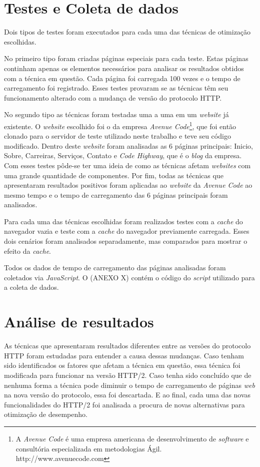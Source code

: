 \section{Testes e Coleta de dados}

Dois tipos de testes foram executados para cada uma das técnicas de otimização escolhidas.

No primeiro tipo foram criadas páginas especiais para cada teste. Estas páginas continham apenas os elementos necessários para analisar os resultados obtidos com a técnica em questão. Cada página foi carregada 100 vezes e o tempo de carregamento foi registrado. Esses testes provaram se as técnicas têm seu funcionamento alterado com a mudança de versão do protocolo HTTP.

No segundo tipo as técnicas foram testadas uma a uma em um \textit{website} já existente. O \textit{website} escolhido foi o da empresa \textit{Avenue Code}\footnote{A \textit{Avenue Code} é uma empresa americana de desenvolvimento de \textit{software} e consultória especializada em metodologias Ágil. http://www.avenuecode.com}, que foi então clonado para o servidor de teste utilizado neste trabalho e teve seu código modificado. Dentro deste \textit{website} foram analisadas as 6 páginas principais: Inicio, Sobre, Carreiras, Serviços, Contato e \textit{Code Highway}, que é o \textit{blog} da empresa. Com esses testes pôde-se ter uma ideia de como as técnicas afetam \textit{websites} com uma grande quantidade de componentes. Por fim, todas as técnicas que apresentaram resultados positivos foram aplicadas ao \textit{website} da \textit{Avenue Code} ao mesmo tempo e o tempo de carregamento das 6 páginas principais foram analisados.

Para cada uma das técnicas escolhidas foram realizados testes com a \textit{cache} do navegador vazia e teste com a \textit{cache} do navegador previamente carregada. Esses dois cenários foram analisados separadamente, mas comparados para mostrar o efeito da \textit{cache}.

Todos os dados de tempo de carregamento das páginas analisadas foram coletados via \textit{JavaScript}. O (ANEXO X) contém o código do \textit{script} utilizado para a coleta de dados.

\section{Análise de resultados}

As técnicas que apresentaram resultados diferentes entre as versões do protocolo HTTP foram estudadas para entender a causa dessas mudanças. Caso tenham sido identificados os fatores que afetam a técnica em questão, essa técnica foi modificada para funcionar na versão HTTP/2. Caso tenha sido concluído que de nenhuma forma a técnica pode diminuir o tempo de carregamento de páginas \textit{web} na nova versão do protocolo, essa foi descartada. E ao final, cada uma das novas funcionalidades do HTTP/2 foi analisada a procura de novas alternativas para otimização de desempenho.